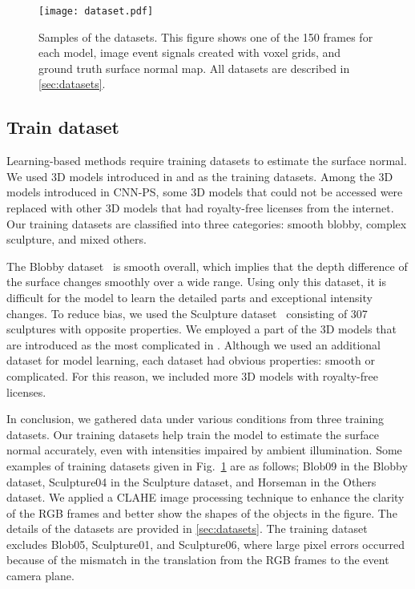 \documentclass[preprint,12pt,authoryear]{elsarticle}
\begin{document}
\begin{figure}[t]
    \centering
    \texttt{[image: dataset.pdf]}
    \caption{Samples of the datasets. This figure shows one of the 150 frames for each model, image event signals created with voxel grids, and ground truth surface normal map. All datasets are described in \ref{sec:datasets}.}
    \label{fig:dataset}
\end{figure}
\subsection{Train dataset}
Learning-based methods require training datasets to estimate the surface normal. We used 3D models introduced in \citep{chen2018ps} and \citep{ikehata2018cnn} as the training datasets. Among the 3D models introduced in CNN-PS, some 3D models that could not be accessed were replaced with other 3D models that had royalty-free licenses from the internet. Our training datasets are classified into three categories: smooth blobby, complex sculpture, and mixed others.

The Blobby dataset~\citep{johnson2011shape} is smooth overall, which implies that the depth difference of the surface changes smoothly over a wide range. Using only this dataset, it is difficult for the model to learn the detailed parts and exceptional intensity changes. To reduce bias, we used the Sculpture dataset~\citep{zisserman2017silnet} consisting of 307 sculptures with opposite properties. We employed a part of the 3D models that are introduced as the most complicated in \citep{chen2018ps}. Although we used an additional dataset for model learning, each dataset had obvious properties: smooth or complicated. For this reason, we included more 3D models with royalty-free licenses.

In conclusion, we gathered data under various conditions from three training datasets. Our training datasets help train the model to estimate the surface normal accurately, even with intensities impaired by ambient illumination. Some examples of training datasets given in Fig.~\ref{fig:dataset} are as follows; Blob09 in the Blobby dataset, Sculpture04 in the Sculpture dataset, and Horseman in the Others dataset. We applied a CLAHE image processing technique to enhance the clarity of the RGB frames and better show the shapes of the objects in the figure. The details of the datasets are provided in \ref{sec:datasets}. The training dataset excludes Blob05, Sculpture01, and Sculpture06, where large pixel errors occurred because of the mismatch in the translation from the RGB frames to the event camera plane.
\end{document}
